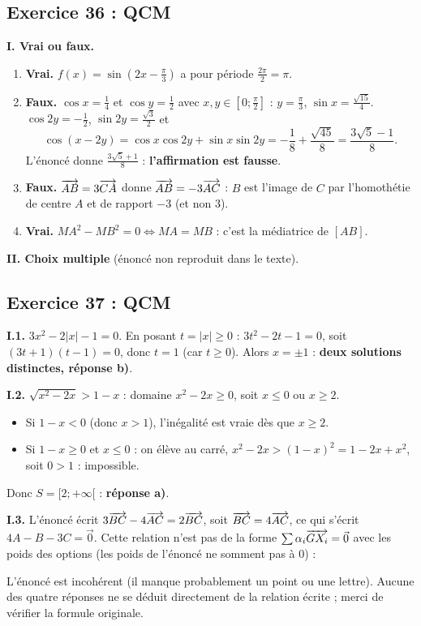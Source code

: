 \subsection{Exercice 36 : QCM}

\textbf{I. Vrai ou faux.}
\begin{enumerate}
  \item \textbf{Vrai.} $f(x)=\sin\left(2x-\frac{\pi}{3}\right)$ a pour p\'eriode $\frac{2\pi}{2}=\pi$.
  \item \textbf{Faux.} $\cos x=\frac14$ et $\cos y=\frac12$ avec $x,y\in\left[0;\frac{\pi}{2}\right]$ : $y=\frac{\pi}{3}$, $\sin x=\frac{\sqrt{15}}{4}$.
  $\cos2y=-\frac12$, $\sin2y=\frac{\sqrt3}{2}$ et
  \[
  \cos(x-2y)=\cos x\cos2y+\sin x\sin2y=-\frac18+\frac{\sqrt{45}}{8}=\frac{3\sqrt5-1}{8}.
  \]
  L'\'enonc\'e donne $\frac{3\sqrt5+1}{8}$ : \textbf{l'affirmation est fausse}.
  \item \textbf{Faux.} $\overrightarrow{AB}=3\overrightarrow{CA}$ donne $\overrightarrow{AB}=-3\overrightarrow{AC}$ : $B$ est l'image de $C$ par l'homoth\'etie de centre $A$ et de rapport $-3$ (et non $3$).
  \item \textbf{Vrai.} $MA^2-MB^2=0\iff MA=MB$ : c'est la m\'ediatrice de $[AB]$.
\end{enumerate}

\textbf{II. Choix multiple} (\'enonc\'e non reproduit dans le texte).

\subsection{Exercice 37 : QCM}

\textbf{I.1.} $3x^2-2|x|-1=0$. En posant $t=|x|\ge0$ : $3t^2-2t-1=0$, soit $(3t+1)(t-1)=0$, donc $t=1$ (car $t\ge0$).
Alors $x=\pm1$ : \textbf{deux solutions distinctes, r\'eponse b)}.

\textbf{I.2.} $\sqrt{x^2-2x}>1-x$ : domaine $x^2-2x\ge0$, soit $x\le0$ ou $x\ge2$.
\begin{itemize}
  \item Si $1-x<0$ (donc $x>1$), l'in\'egalit\'e est vraie d\`es que $x\ge2$.
  \item Si $1-x\ge0$ et $x\le0$ : on \'el\`eve au carr\'e, $x^2-2x>(1-x)^2=1-2x+x^2$, soit $0>1$ : impossible.
\end{itemize}
Donc $S=[2;+\infty[$ : \textbf{r\'eponse a)}.

\textbf{I.3.} L'\'enonc\'e \'ecrit $3\overrightarrow{BC}-4\overrightarrow{AC}=2\overrightarrow{BC}$, soit $\overrightarrow{BC}=4\overrightarrow{AC}$, ce qui s'\'ecrit $4A-B-3C=\vec 0$.
Cette relation n'est pas de la forme $\sum\alpha_i\overrightarrow{GX_i}=\vec 0$ avec les poids des options (les poids de l'\'enonc\'e ne somment pas \`a $0$) :
\begin{rem} L'\'enonc\'e est incoh\'erent (il manque probablement un point ou une lettre). Aucune des quatre r\'eponses ne se d\'eduit
directement de la relation \'ecrite ; merci de v\'erifier la formule originale.\end{rem}

